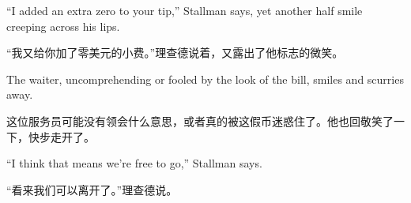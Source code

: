 \ifdefined\eng
``I added an extra zero to your tip,'' Stallman says, yet another half smile creeping across his lips.
\fi

\ifdefined\chs
“我又给你加了零美元的小费。”理查德说着，又露出了他标志的微笑。
\fi

\ifdefined\eng
The waiter, uncomprehending or fooled by the look of the bill, smiles and scurries away.
\fi

\ifdefined\chs
这位服务员可能没有领会什么意思，或者真的被这假币迷惑住了。他也回敬笑了一下，快步走开了。
\fi

\ifdefined\eng
``I think that means we're free to go,'' Stallman says.
\fi

\ifdefined\chs
“看来我们可以离开了。”理查德说。
\fi

\theendnotes
\setcounter{endnote}{0}
